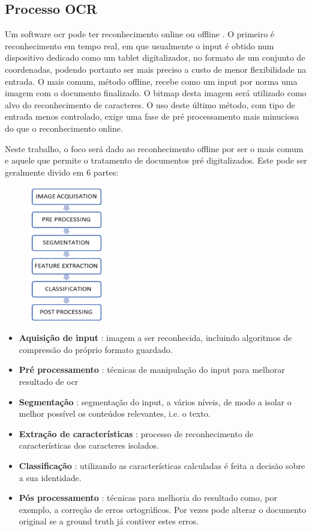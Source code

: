 \subsection{Processo OCR}
Um software \acrshort{ocr} pode ter reconhecimento online ou offline \citep{10.5555/1074100.1074664}\citep{6993174}.  O primeiro é reconhecimento em tempo real, em que usualmente o input é obtido num dispositivo dedicado como um tablet digitalizador,  no formato de um conjunto de coordenadas, podendo portanto ser mais preciso a custo de menor flexibilidade na entrada. O mais comum, método offline, recebe como um input por norma uma imagem com o documento finalizado. O bitmap desta imagem será utilizado como alvo do reconhecimento de caracteres. O uso deste último método, com tipo de entrada menos controlado, exige uma fase de pré processamento mais minuciosa do que o reconhecimento online.

Neste trabalho, o foco será dado ao reconhecimento offline por ser o mais comum e aquele que permite o tratamento de documentos pré digitalizados.
Este pode ser geralmente divido em 6 partes:

\begin{figure}	
	\includegraphics[width=0.3\textwidth]{images/ilustracoes/processo_ocr.png}
\end{figure}
\noindent
\begin{itemize}
    \item \textbf{Aquisição de input} : imagem a ser reconhecida, incluindo algoritmos de compressão do próprio formato guardado.
    \item  \textbf{Pré processamento} : técnicas de manipulação do input para melhorar resultado de \acrshort{ocr}
    \item \textbf{Segmentação} : segmentação do input, a vários níveis, de modo a isolar o melhor possível os conteúdos relevantes, i.e. o texto.
    \item \textbf{Extração de características} : processo de reconhecimento de características dos caracteres isolados.
    \item \textbf{Classificação} : utilizando as características calculadas é feita a decisão sobre a sua identidade.
    \item \textbf{Pós processamento} : técnicas para melhoria do resultado como, por exemplo, a correção de erros ortográficos. Por vezes pode alterar o documento original se a \gls{ground truth} já contiver estes erros.
\end{itemize}
\noindent


